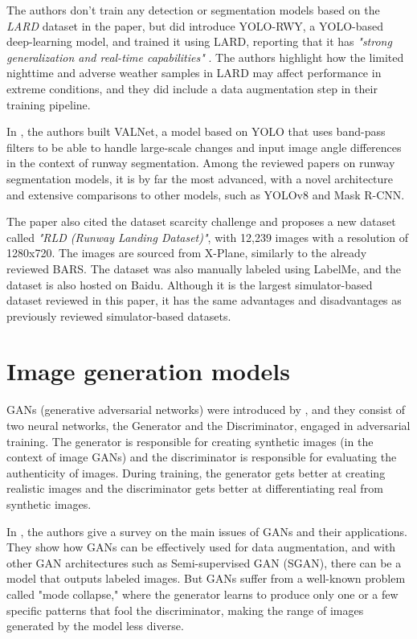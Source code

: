 The authors don't train any detection or segmentation models based on the
\emph{LARD} dataset in the paper, but \cite{li_yolo-rwy_2024} did introduce
YOLO-RWY, a YOLO-based \cite{redmon_you_2016} deep-learning model, and trained it using LARD, reporting that it has \emph{"strong generalization and real-time capabilities"} \cite{li_yolo-rwy_2024}. The authors highlight how the limited nighttime and adverse weather samples in LARD may affect performance in extreme conditions, and they did include a data augmentation step in their training pipeline.

In \cite{wang_valnet_2024}, the authors built VALNet, a model based on YOLO that uses band-pass filters to be able to handle large-scale changes and input image angle differences in the context of runway segmentation. Among the reviewed papers on runway segmentation models, it is by far the most advanced, with a novel architecture and extensive comparisons to other models, such as YOLOv8 and Mask R-CNN.

The paper also cited the dataset scarcity challenge and proposes a new dataset called \emph{"RLD (Runway Landing Dataset)"}, with 12,239 images with a resolution of 1280x720. The images are sourced from X-Plane, similarly to the already reviewed BARS. The dataset was also manually labeled using LabelMe, and the dataset is also hosted on Baidu. Although it is the largest simulator-based dataset reviewed in this paper, it has the same advantages and disadvantages as previously reviewed simulator-based datasets.

\section{Image generation models}

GANs (generative adversarial networks) were introduced by \cite{goodfellow_generative_2014}, and they consist of two neural networks, the Generator and the Discriminator, engaged in adversarial training. The generator is responsible for creating synthetic images (in the context of image GANs) and the discriminator is responsible for evaluating the authenticity of images. During training, the generator gets better at creating realistic images and the discriminator gets better at differentiating real from synthetic images.

In \cite{cohen_generative_2022}, the authors give a survey on the main issues of GANs and their applications. They show how GANs can be effectively used for data augmentation, and with other GAN architectures such as Semi-supervised GAN (SGAN), there can be a model that outputs labeled images. But GANs suffer from a well-known problem called "mode collapse," where the generator learns to produce only one or a few specific patterns that fool the discriminator, making the range of images generated by the model less diverse.

